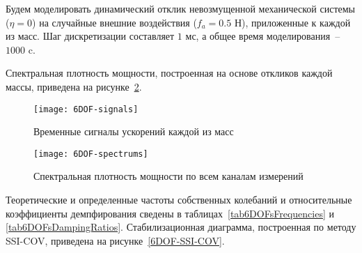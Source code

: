 Будем моделировать динамический отклик  невозмущенной механической системы ($ \eta = 0 $) на случайные внешние воздействия ($ f_a = 0.5 $ Н), приложенные к каждой из масс. Шаг дискретизации составляет $ 1 $ мс, а общее время моделирования~--~$ 1000 $ c.

Спектральная плотность мощности, построенная на основе откликов каждой массы, приведена на рисунке~\ref{6DOF-spectrums}.

\begin{figure}[!htb]
	\centerfloat
	\texttt{[image: 6DOF-signals]}
	\caption{Временные сигналы ускорений каждой из масс} \label{6DOF-signals}
\end{figure}

\begin{figure}[!htb]
	\centerfloat
	\texttt{[image: 6DOF-spectrums]}
	\caption{Спектральная плотность мощности по всем каналам измерений} \label{6DOF-spectrums}
\end{figure}

Теоретические и определенные частоты собственных колебаний и относительные коэффициенты демпфирования сведены в таблицах~\ref{tab6DOFsFrequencies} и \ref{tab6DOFsDampingRatios}. Стабилизационная диаграмма, построенная по методу SSI-COV, приведена на рисунке~\ref{6DOF-SSI-COV}.


